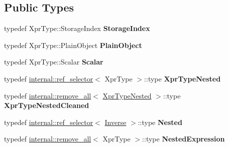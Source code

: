 \subsection*{Public Types}
\begin{DoxyCompactItemize}
\item 
\mbox{\label{class_eigen_1_1_inverse_a24a2e9d42e51ebbfebb19abf69189277}} 
typedef Xpr\+Type\+::\+Storage\+Index {\bfseries Storage\+Index}
\item 
\mbox{\label{class_eigen_1_1_inverse_a43944177f0ff3b1674204d5ee7e9ccb3}} 
typedef Xpr\+Type\+::\+Plain\+Object {\bfseries Plain\+Object}
\item 
\mbox{\label{class_eigen_1_1_inverse_aec6048fd8cc031a99b0f458841b3811f}} 
typedef Xpr\+Type\+::\+Scalar {\bfseries Scalar}
\item 
\mbox{\label{class_eigen_1_1_inverse_a0c69f9e9bc52018fe6a3dec47d363066}} 
typedef \hyperlink{struct_eigen_1_1internal_1_1ref__selector}{internal\+::ref\+\_\+selector}$<$ Xpr\+Type $>$\+::type {\bfseries Xpr\+Type\+Nested}
\item 
\mbox{\label{class_eigen_1_1_inverse_a9785bc56c3c90a9435d6248d2706b17c}} 
typedef \hyperlink{struct_eigen_1_1internal_1_1remove__all}{internal\+::remove\+\_\+all}$<$ \hyperlink{class_eigen_1_1internal_1_1_tensor_lazy_evaluator_writable}{Xpr\+Type\+Nested} $>$\+::type {\bfseries Xpr\+Type\+Nested\+Cleaned}
\item 
\mbox{\label{class_eigen_1_1_inverse_a47767cc8b6793334f19aa67834191bc5}} 
typedef \hyperlink{struct_eigen_1_1internal_1_1ref__selector}{internal\+::ref\+\_\+selector}$<$ \hyperlink{class_eigen_1_1_inverse}{Inverse} $>$\+::type {\bfseries Nested}
\item 
\mbox{\label{class_eigen_1_1_inverse_a35e730de4de44f631213d25001e3edc3}} 
typedef \hyperlink{struct_eigen_1_1internal_1_1remove__all}{internal\+::remove\+\_\+all}$<$ Xpr\+Type $>$\+::type {\bfseries Nested\+Expression}
\item 
\mbox{\label{class_eigen_1_1_inverse_a24a2e9d42e51ebbfebb19abf69189277}} 

\end{DoxyCompactItemize}
